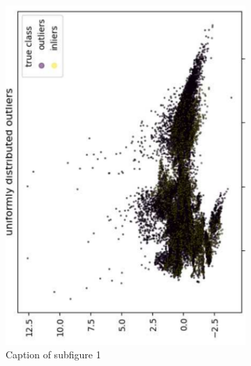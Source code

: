 \begin{figure}[!ht]
     \centering
     \begin{subfigure}[b]{0.45\textwidth}
         \centering
         \includegraphics[angle=-90,width=\textwidth]{manual/images/graph_a.pdf}
         \caption{Caption of subfigure 1}
         \label{fig:Subfigure1}
     \end{subfigure}
     \hfill
     \begin{subfigure}[b]{0.45\textwidth}
         \centering

\end{subfigure}
\end{figure}
